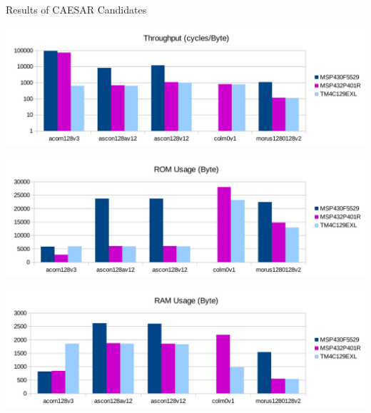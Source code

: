 \documentclass[xcolor=pdftex,dvipsnames,table,final]{beamer}
\newcommand{\rb}[1]{\raisebox{1.3ex}[-1.3ex]{#1}}
\begin{document}
\begin{frame}[fragile]{}
\begin{columns}[t, totalwidth=\textwidth]
\begin{column}{.675\linewidth}
\begin{columns}
\begin{column}{.473\linewidth}
       \begin{block}{Results of CAESAR Candidates}
        \vspace{-1ex}
         \begin{center}
           \includegraphics[width=1.0\linewidth]{../figures/throughput}


           \includegraphics[width=1.0\linewidth]{../figures/romusage}


           \includegraphics[width=1.0\linewidth]{../figures/ramusage}


\end{center}
\end{block}
\end{column}
\end{columns}
\end{column}
\end{columns}
\end{frame}
\end{document}
